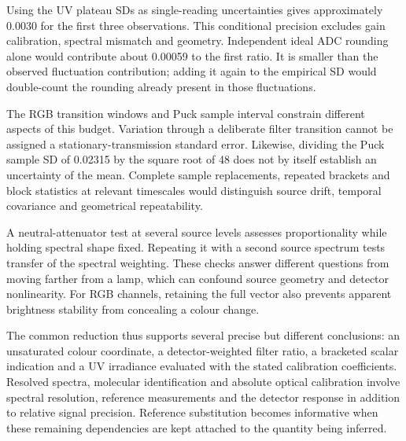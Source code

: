 Using the UV plateau SDs as single-reading uncertainties gives approximately 0.0030 for the first three observations. This conditional precision excludes gain calibration, spectral mismatch and geometry. Independent ideal ADC rounding alone would contribute about 0.00059 to the first ratio. It is smaller than the observed fluctuation contribution; adding it again to the empirical SD would double-count the rounding already present in those fluctuations.

The RGB transition windows and Puck sample interval constrain different aspects of this budget. Variation through a deliberate filter transition cannot be assigned a stationary-transmission standard error. Likewise, dividing the Puck sample SD of 0.02315 by the square root of 48 does not by itself establish an uncertainty of the mean. Complete sample replacements, repeated brackets and block statistics at relevant timescales would distinguish source drift, temporal covariance and geometrical repeatability.

A neutral-attenuator test at several source levels assesses proportionality while holding spectral shape fixed. Repeating it with a second source spectrum tests transfer of the spectral weighting. These checks answer different questions from moving farther from a lamp, which can confound source geometry and detector nonlinearity. For RGB channels, retaining the full vector also prevents apparent brightness stability from concealing a colour change.

The common reduction thus supports several precise but different conclusions: an unsaturated colour coordinate, a detector-weighted filter ratio, a bracketed scalar indication and a UV irradiance evaluated with the stated calibration coefficients. Resolved spectra, molecular identification and absolute optical calibration involve spectral resolution, reference measurements and the detector response in addition to relative signal precision. Reference substitution becomes informative when these remaining dependencies are kept attached to the quantity being inferred.
